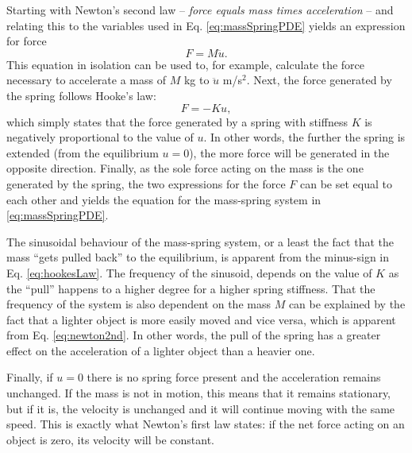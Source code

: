 Starting with Newton's second law -- \textit{force equals mass times acceleration} -- and relating this to the variables used in Eq. \eqref{eq:massSpringPDE} yields an expression for force
\begin{equation}\label{eq:newton2nd}
    F = M\ddot u.
\end{equation}
This equation in isolation can be used to, for example, calculate the force necessary to accelerate a mass of $M$ kg to $\ddot u$ m/s$^2$. Next, the force generated by the spring follows Hooke's law:
\begin{equation}\label{eq:hookesLaw}
    F = -Ku,
\end{equation} 
which simply states that the force generated by a spring with stiffness $K$ is negatively proportional to the value of $u$. In other words, the further the spring is extended (from the equilibrium $u=0$), the more force will be generated in the opposite direction. Finally, as the sole force acting on the mass is the one generated by the spring, the two expressions for the force $F$ can be set equal to each other and yields the equation for the mass-spring system in \eqref{eq:massSpringPDE}. 

The sinusoidal behaviour of the mass-spring system, or a least the fact that the mass ``gets pulled back'' to the equilibrium, is apparent from the minus-sign in Eq. \eqref{eq:hookesLaw}. The frequency of the sinusoid, depends on the value of $K$ as the ``pull'' happens to a higher degree for a higher spring stiffness. 
That the frequency of the system is also dependent on the mass $M$ can be explained by the fact that a lighter object is more easily moved and vice versa, which is apparent from Eq. \eqref{eq:newton2nd}. In other words, the pull of the spring has a greater effect on the acceleration of a lighter object than a heavier one. 



Finally, if $u = 0$ there is no spring force present and the acceleration remains unchanged. If the mass is not in motion, this means that it remains stationary, but if it is, the velocity is unchanged and it will continue moving with the same speed. This is exactly what Newton's first law states: if the net force acting on an object is zero, its velocity will be constant.

